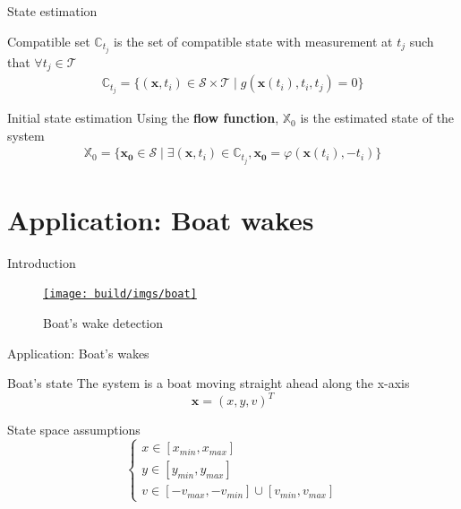 \documentclass{beamer}
\begin{document}
            \begin{frame}{State estimation}
                \begin{block}{Compatible set}
                    $\mathbb{C}_{t_j}$ is the set of compatible state with measurement at $t_j$ such that $\forall t_j \in \mathcal{T}$
                    \begin{eqnarray}
                        \mathbb{C}_{t_j} = \{ (\mathbf{x}, t_i) \in \mathcal{S} \times \mathcal{T} \mid g(\mathbf{x}(t_i), t_i, t_j) = 0\}
                    \end{eqnarray}
                \end{block}

                \begin{block}{Initial state estimation}
                    Using the \textbf{flow function}, $\mathbb{X}_0$ is the estimated state of the system
                    \begin{eqnarray}
                        \mathbb{X}_0 = \{ \mathbf{x_0} \in \mathcal{S} \mid \exists (\mathbf{x}, t_i) \in \mathbb{C}_{t_j}, \mathbf{x_0} = \varphi(\mathbf{x}(t_i), -t_i) \}
                    \end{eqnarray}
                \end{block}
            \end{frame}
    
    \section{Application: Boat wakes}

            \begin{frame}{Introduction}
                \begin{figure}
                    \centering
                    \href{run:boat.mp4?autostart&loop}{\texttt{[image: build/imgs/boat]}}
                    \caption{Boat's wake detection}
                \end{figure}
            \end{frame}

            \begin{frame}{Application: Boat's wakes}
                \begin{block}{Boat's state}
                    The system is a boat moving straight ahead along the x-axis
                    $$\mathbf{x} = (x, y, v)^T$$ 
                \end{block}
                \begin{block}{State space assumptions}
                    \begin{equation}
                    \begin{cases}x \in [x_{min}, x_{max}] \\ y \in [y_{min}, y_{max}] \\ v \in [-v_{max}, -v_{min}] \cup [v_{min}, v_{max}] \end{cases}
                    \end{equation}
                \end{block}
            \end{frame}
\end{document}
